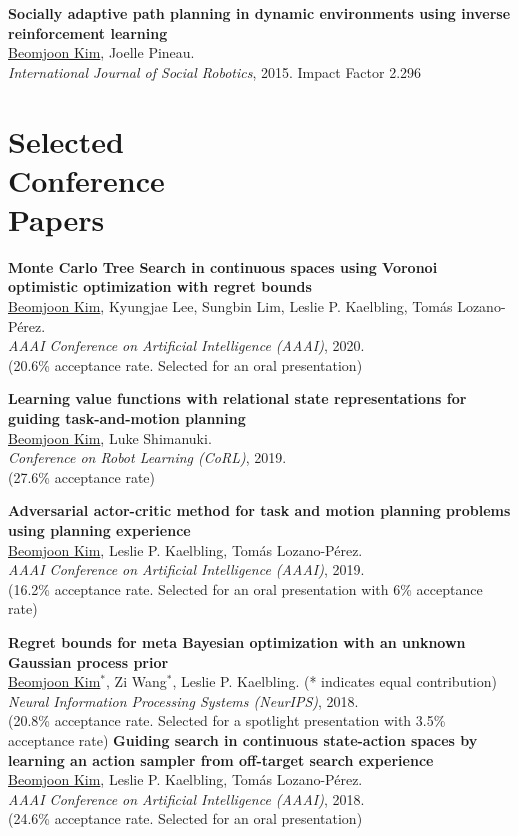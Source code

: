 \documentclass[line,margin,letterpaper]{res}
\begin{document}
\begin{resume}
\textbf{Socially adaptive path planning in dynamic environments using inverse reinforcement learning}\\
\underline{Beomjoon Kim}, Joelle Pineau.\\
{\sl International Journal of Social Robotics}, 2015.
{\small Impact Factor 2.296}

\section{Selected\\ Conference \\Papers}
\textbf{Monte Carlo Tree Search in continuous spaces using Voronoi optimistic optimization with regret bounds}\\
\underline{Beomjoon Kim}, Kyungjae Lee, Sungbin Lim, Leslie P. Kaelbling, Tom\'as Lozano-P\'erez.\\
{\sl AAAI Conference on Artificial Intelligence (AAAI)}, 2020. \\
{\small (20.6\% acceptance rate. Selected for an oral presentation)}

\textbf{Learning value functions with relational state representations for guiding task-and-motion planning}\\
\underline{Beomjoon Kim}, Luke Shimanuki.\\
{\sl Conference on Robot Learning (CoRL)}, 2019. \\
{\small (27.6\% acceptance rate)}

\textbf{Adversarial actor-critic method for task and motion planning problems using planning experience}\\
\underline{Beomjoon Kim}, Leslie P. Kaelbling, Tom\'as Lozano-P\'erez.\\
{\sl AAAI Conference on Artificial Intelligence (AAAI)}, 2019. \\
{\small (16.2\% acceptance rate. Selected for an oral presentation with 6\% acceptance rate)}

\textbf{Regret bounds for meta Bayesian optimization with an unknown Gaussian process prior}\\
\underline{Beomjoon Kim}$^*$, Zi Wang$^*$,  Leslie P. Kaelbling. {\small(* indicates equal contribution)}\\
{\sl Neural Information Processing Systems (NeurIPS)}, 2018.\\
{\small (20.8\% acceptance rate. Selected for a spotlight presentation with 3.5\% acceptance rate)}
\newpage
\textbf{Guiding search in continuous state-action spaces by learning an action sampler from off-target search experience}\\
\underline{Beomjoon Kim}, Leslie P. Kaelbling, Tom\'as Lozano-P\'erez.\\
{\sl AAAI Conference on Artificial Intelligence (AAAI)}, 2018.\\
{\small (24.6\% acceptance rate. Selected for an oral presentation)}


\end{resume}
\end{document}
